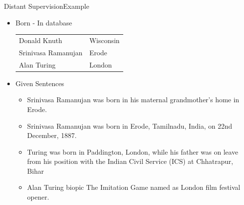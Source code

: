 \documentclass{beamer}
\begin{document}
\begin{frame}{Distant Supervision}{Example}
\begin{itemize}
 
\item Born - In database
 \begin{center}
\begin{tabular}{|l|l|}
\hline
Donald Knuth & Wisconsin \\
Srinivasa Ramanujan & Erode \\
Alan Turing & London \\
\hline
\end{tabular}
\end{center}
\item Given Sentences
\begin{itemize}
\item Srinivasa Ramanujan was born in his maternal grandmother’s home in Erode.
\item Srinivasa Ramanujan was born in Erode, Tamilnadu, India, on 22nd December, 1887.
\item Turing was born in Paddington, London, while his father was on leave from his position with the Indian Civil Service (ICS) at Chhatrapur, Bihar
\item Alan Turing biopic The Imitation Game named as London film festival opener.
\end{itemize}
\end{itemize}
 
\end{frame}
\end{document}
